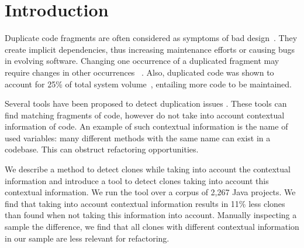 \documentclass[conference]{IEEEtran}
\begin{document}
\section{Introduction}
Duplicate code fragments are often considered as symptoms of bad design~\cite{fowler2018refactoring}. They create implicit dependencies, thus increasing maintenance efforts or causing bugs in evolving software. Changing one occurrence of a duplicated fragment may require changes in other occurrences ~\cite{ostberg2014automatically}. Also, duplicated code was shown to account for 25\% of total system volume~\cite{bruntink2005use}, entailing more code to be maintained.

Several tools have been proposed to detect duplication issues \cite{roy2009comparison, svajlenko2014evaluating, sheneamer2016survey}. These tools can find matching fragments of code, however do not take into account contextual information of code. An example of such contextual information is the name of used variables: many different methods with the same name can exist in a codebase. This can obstruct refactoring opportunities.

We describe a method to detect clones while taking into account the contextual information and introduce a tool to detect clones taking into account this contextual information. We run the tool over a corpus of 2,267 Java projects. We find that taking into account contextual information results in 11\% less clones than found when not taking this information into account. Manually inspecting a sample the difference, we find that all clones with different contextual information in our sample are less relevant for refactoring.
\end{document}
